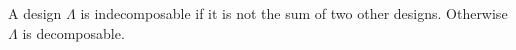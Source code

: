 A design $\Lambda$ is indecomposable if it is not the sum of two other designs. Otherwise $\Lambda$ is decomposable.
